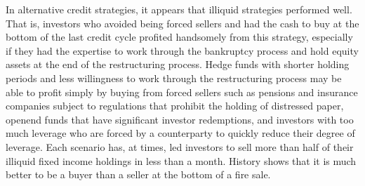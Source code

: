\documentclass[11pt]{article}
\begin{document}
In alternative credit strategies, it appears that illiquid strategies performed well. That is, investors who avoided being forced sellers and had the cash to buy at the bottom of the last credit cycle profited handsomely from this strategy, especially if they had the expertise to work through the bankruptcy process and hold equity assets at the end of the restructuring process. Hedge funds with shorter holding periods and less willingness to work through the restructuring process may be able to profit simply by buying from forced sellers such as pensions and insurance companies subject to regulations that prohibit the holding of distressed paper, openend funds that have significant investor redemptions, and investors with too much leverage who are forced by a counterparty to quickly reduce their degree of leverage. Each scenario has, at times, led investors to sell more than half of their illiquid fixed income holdings in less than a month. History shows that it is much better to be a buyer than a seller at the bottom of a fire sale.
\end{document}
